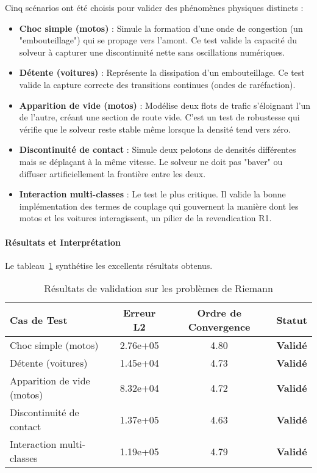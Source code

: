 Cinq scénarios ont été choisis pour valider des phénomènes physiques distincts :
\begin{itemize}
    \item \textbf{Choc simple (motos)} : Simule la formation d'une onde de congestion (un "embouteillage") qui se propage vers l'amont. Ce test valide la capacité du solveur à capturer une discontinuité nette sans oscillations numériques.
    \item \textbf{Détente (voitures)} : Représente la dissipation d'un embouteillage. Ce test valide la capture correcte des transitions continues (ondes de raréfaction).
    \item \textbf{Apparition de vide (motos)} : Modélise deux flots de trafic s'éloignant l'un de l'autre, créant une section de route vide. C'est un test de robustesse qui vérifie que le solveur reste stable même lorsque la densité tend vers zéro.
    \item \textbf{Discontinuité de contact} : Simule deux pelotons de densités différentes mais se déplaçant à la même vitesse. Le solveur ne doit pas "baver" ou diffuser artificiellement la frontière entre les deux.
    \item \textbf{Interaction multi-classes} : Le test le plus critique. Il valide la bonne implémentation des termes de couplage qui gouvernent la manière dont les motos et les voitures interagissent, un pilier de la revendication R1.
\end{itemize}

\paragraph{Résultats et Interprétation}

Le tableau~\ref{tab:riemann_validation_results} synthétise les excellents résultats obtenus.

\begin{table}[htbp]
    \centering
    \caption{Résultats de validation sur les problèmes de Riemann}
    \label{tab:riemann_validation_results}
    \begin{tabular}{|l|c|c|c|}
        \hline
        \textbf{Cas de Test}       & \textbf{Erreur L2} & \textbf{Ordre de Convergence} & \textbf{Statut} \\
        \hline
        Choc simple (motos)        & 2.76e+05           & 4.80                          & \textbf{Validé} \\
        Détente (voitures)         & 1.45e+04           & 4.73                          & \textbf{Validé} \\
        Apparition de vide (motos) & 8.32e+04           & 4.72                          & \textbf{Validé} \\
        Discontinuité de contact   & 1.37e+05           & 4.63                          & \textbf{Validé} \\
        Interaction multi-classes  & 1.19e+05           & 4.79                          & \textbf{Validé} \\
        \hline
    \end{tabular}
\end{table}

